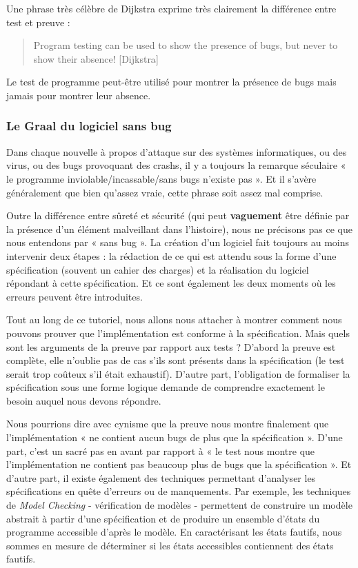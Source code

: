 \documentclass[12pt,francais,]{scrbook}
\begin{document}
Une phrase très célèbre de Dijkstra exprime très clairement la
différence entre test et preuve :

\begin{quote}
Program testing can be used to show the presence of bugs, but never to
show their absence! \hfill {[}Dijkstra{]}
\end{quote}

Le test de programme peut-être utilisé pour montrer la présence de bugs
mais jamais pour montrer leur absence.

\subsubsection{Le Graal du logiciel sans
bug}\label{le-graal-du-logiciel-sans-bug}

Dans chaque nouvelle à propos d'attaque sur des systèmes informatiques,
ou des virus, ou des bugs provoquant des crashs, il y a toujours la
remarque séculaire « le programme inviolable/incassable/sans bugs
n'existe pas ». Et il s'avère généralement que bien qu'assez vraie,
cette phrase soit assez mal comprise.

Outre la différence entre sûreté et sécurité (qui peut
\textbf{vaguement} être définie par la présence d'un élément malveillant
dans l'histoire), nous ne précisons pas ce que nous entendons par « sans
bug ». La création d'un logiciel fait toujours au moins intervenir deux
étapes : la rédaction de ce qui est attendu sous la forme d'une
spécification (souvent un cahier des charges) et la réalisation du
logiciel répondant à cette spécification. Et ce sont également les deux
moments où les erreurs peuvent être introduites.

Tout au long de ce tutoriel, nous allons nous attacher à montrer comment
nous pouvons prouver que l'implémentation est conforme à la
spécification. Mais quels sont les arguments de la preuve par rapport
aux tests ? D'abord la preuve est complète, elle n'oublie pas de cas
s'ils sont présents dans la spécification (le test serait trop coûteux
s'il était exhaustif). D'autre part, l'obligation de formaliser la
spécification sous une forme logique demande de comprendre exactement le
besoin auquel nous devons répondre.

Nous pourrions dire avec cynisme que la preuve nous montre finalement
que l'implémentation « ne contient aucun bugs de plus que la
spécification ». D'une part, c'est un sacré pas en avant par rapport à «
le test nous montre que l'implémentation ne contient pas beaucoup plus
de bugs que la spécification ». Et d'autre part, il existe également des
techniques permettant d'analyser les spécifications en quête d'erreurs
ou de manquements. Par exemple, les techniques de \emph{Model Checking}
- vérification de modèles - permettent de construire un modèle abstrait
à partir d'une spécification et de produire un ensemble d'états du
programme accessible d'après le modèle. En caractérisant les états
fautifs, nous sommes en mesure de déterminer si les états accessibles
contiennent des états fautifs.
\end{document}
